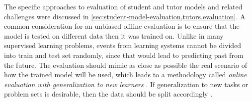 The specific approaches to evaluation of student and tutor models and related challenges
were discussed in \cref{sec:student-model-evaluation,tutors.evaluation}.
A common consideration for an unbiased offline evaluation is to ensure that
the model is tested on different data then it was trained on.
Unlike in many supervised learning problems, events from learning systems
cannot be divided into train and test set randomly, since that would lead
to predicting past from the future. %
The evaluation should mimic as close as possible the real scenario of how the
trained model will be used, which leads to a methodology called \emph{online
evaluation with generalization to new learners} \cite{pelanek-learner-modeling}.
If generalization to new tasks or problem sets %
is desirable, then the data should be split accordingly \cite{student-models-review-2012}.


%

